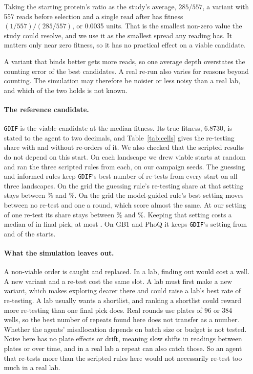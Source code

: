 Taking the starting protein's ratio as the study's average, $285/557$, a variant with 557 reads before
selection and a single read after has fitness $(1/557)/(285/557)$, or 0.0035 units. That is the smallest
non-zero value the study could resolve, and we use it as the smallest spread any reading has. It matters
only near zero fitness, so it has no practical effect on a viable candidate.

A variant that binds better gets more reads, so one average depth overstates the counting error of the best
candidates. A real re-run also varies for reasons beyond counting. The simulation may therefore be noisier or less
noisy than a real lab, and which of the two holds is not known.

\paragraph{The reference candidate.} \texttt{GDIF} is the viable candidate at the median fitness. Its true
fitness, 6.8730, is stated to the agent to two decimals, and Table~\ref{tab:cells} gives the re-testing
share with and without re-orders of it. We also checked that the scripted results do not depend on this
start. On each landscape we drew \nStartsRandom{} viable starts at random and ran the three scripted rules from each,
on our campaign seeds. The guessing and informed rules keep \texttt{GDIF}'s best number of re-tests from every start on all three landscapes. On the grid the guessing rule's re-testing share at that setting stays
between \nStartGuessShareMinGrid\% and \nStartGuessShareMaxGrid\%. On the grid the model-guided rule's best setting moves
between no re-test and one a round, which score almost the same. At our setting of one re-test its share stays between \nStartMgShareMinGrid\% and \nStartMgShareMaxGrid\%. Keeping that setting costs a median of
\nStartMgPickLostMedGrid{} in final pick, at most \nStartMgPickLostMaxGrid. On GB1 and PhoQ it keeps \texttt{GDIF}'s setting from \nStartSameKGbMg{} and \nStartSameKPqMg{} of the \nStartsRandom{} starts.

\paragraph{What the simulation leaves out.} A non-viable order is caught and replaced. In a lab, finding out would
cost a well. A new variant and a re-test cost the same slot. A lab must first make a new variant, which makes exploring dearer there and could raise a lab's best rate of re-testing. A lab
usually wants a shortlist, and ranking a shortlist could reward more re-testing than one final pick does.
Real rounds use plates of 96 or 384 wells, so the best number of repeats found here does not transfer as a
number. Whether the agents' misallocation depends on batch size or budget is not tested. Noise here has no plate effects
or drift, meaning slow shifts in readings between plates or over time, and in a real lab a repeat can also
catch those. So an agent that re-tests more than the scripted rules here would not necessarily re-test too much in a
real lab.

